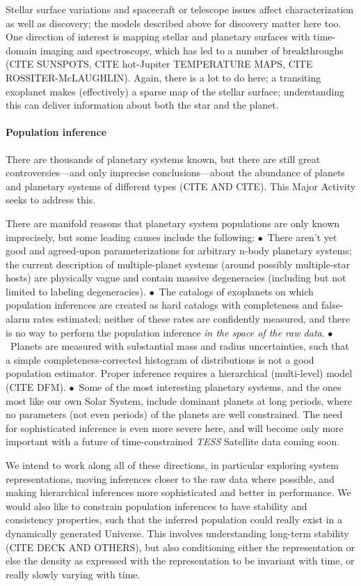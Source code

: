 \documentclass[12pt]{article}
\begin{document}
Stellar surface variations and spacecraft or telescope issues affect
characterization as well as discovery; the models described above for
discovery matter here too. One direction of interest is mapping
stellar and planetary surfaces with time-domain imaging and
spectroscopy, which has led to a number of breakthroughs (CITE
SUNSPOTS, CITE hot-Jupiter TEMPERATURE MAPS, CITE
ROSSITER-McLAUGHLIN). Again, there is a lot to do here; a transiting
exoplanet makes (effectively) a sparse map of the stellar surface;
understanding this can deliver information about both the star and the
planet.

\paragraph{Population inference}
There are thousands of planetary systems known, but there are still
great controversies---and only imprecise conclusions---about the
abundance of planets and planetary systems of different types (CITE
AND CITE). This Major Activity seeks to address this.

There are manifold reasons that planetary system populations are only
known imprecisely, but some leading causes include the following:
$\bullet$~There aren't yet good and agreed-upon parameterizations for
arbitrary n-body planetary systems; the current description of
multiple-planet systems (around possibly multiple-star hosts) are
physically vague and contain massive degeneracies (including but not
limited to labeling degeneracies). $\bullet$~The catalogs of
exoplanets on which population inferences are created as hard catalogs
with completeness and false-alarm rates estimated; neither of these
rates are confidently measured, and there is no way to perform the
population inference \emph{in the space of the raw
  data}. $\bullet$~Planets are measured with substantial mass and
radius uncertainties, such that a simple completeness-corrected
histogram of distributions is not a good population estimator. Proper
inference requires a hierarchical (multi-level) model (CITE
DFM). $\bullet$~Some of the most interesting planetary systems, and
the ones most like our own Solar System, include dominant planets at
long periods, where no parameters (not even periods) of the planets
are well constrained. The need for sophisticated inference is even
more severe here, and will become only more important with a future of
time-constrained \textsl{TESS} Satellite data coming soon.

We intend to work along all of these directions, in particular
exploring system representations, moving inferences closer to the raw
data where possible, and making hierarchical inferences more
sophisticated and better in performance. We would also like to
constrain population inferences to have stability and consistency
properties, such that the inferred population could really exist in a
dynamically generated Universe. This involves understanding long-term
stability (CITE DECK AND OTHERS), but also conditioning either the
representation or else the density as expressed with the
representation to be invariant with time, or really slowly varying
with time.
\end{document}
